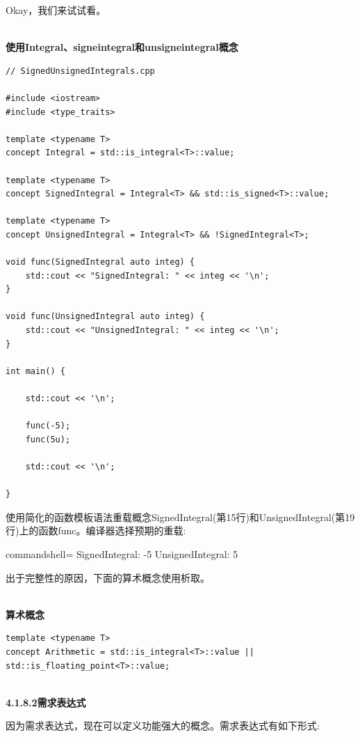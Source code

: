 Okay，我们来试试看。

\hspace*{\fill} \\ %
\noindent
\textbf{使用Integral、signeintegral和unsigneintegral概念}
\begin{lstlisting}[style=styleCXX]
// SignedUnsignedIntegrals.cpp

#include <iostream>
#include <type_traits>

template <typename T>
concept Integral = std::is_integral<T>::value;

template <typename T>
concept SignedIntegral = Integral<T> && std::is_signed<T>::value;

template <typename T>
concept UnsignedIntegral = Integral<T> && !SignedIntegral<T>;

void func(SignedIntegral auto integ) {
	std::cout << "SignedIntegral: " << integ << '\n';
}

void func(UnsignedIntegral auto integ) {
	std::cout << "UnsignedIntegral: " << integ << '\n';
}

int main() {
	
	std::cout << '\n';
	
	func(-5);
	func(5u);
	
	std::cout << '\n';

}
\end{lstlisting}

使用简化的函数模板语法重载概念SignedIntegral(第15行)和UnsignedIntegral(第19行)上的函数func。编译器选择预期的重载:

\begin{tcblisting}{commandshell={}}
SignedIntegral: -5
UnsignedIntegral: 5
\end{tcblisting}

出于完整性的原因，下面的算术概念使用析取。

\hspace*{\fill} \\ %
\noindent
\textbf{算术概念}
\begin{lstlisting}[style=styleCXX]
template <typename T>
concept Arithmetic = std::is_integral<T>::value || std::is_floating_point<T>::value;
\end{lstlisting}

\hspace*{\fill} \\ %
\noindent
\textbf{4.1.8.2\hspace{0.2cm}需求表达式}

因为需求表达式，现在可以定义功能强大的概念。需求表达式有如下形式:

